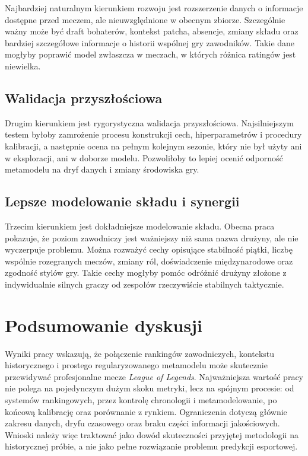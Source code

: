 Najbardziej naturalnym kierunkiem rozwoju jest rozszerzenie danych o informacje dostępne przed meczem, ale nieuwzględnione w obecnym zbiorze. Szczególnie ważny może być draft bohaterów, kontekst patcha, absencje, zmiany składu oraz bardziej szczegółowe informacje o historii wspólnej gry zawodników. Takie dane mogłyby poprawić model zwłaszcza w meczach, w których różnica ratingów jest niewielka.

\subsection{Walidacja przyszłościowa}

Drugim kierunkiem jest rygorystyczna walidacja przyszłościowa. Najsilniejszym testem byłoby zamrożenie procesu konstrukcji cech, hiperparametrów i procedury kalibracji, a następnie ocena na pełnym kolejnym sezonie, który nie był użyty ani w eksploracji, ani w doborze modelu. Pozwoliłoby to lepiej ocenić odporność metamodelu na dryf danych i zmiany środowiska gry.

\subsection{Lepsze modelowanie składu i synergii}

Trzecim kierunkiem jest dokładniejsze modelowanie składu. Obecna praca pokazuje, że poziom zawodniczy jest ważniejszy niż sama nazwa drużyny, ale nie wyczerpuje problemu. Można rozważyć cechy opisujące stabilność piątki, liczbę wspólnie rozegranych meczów, zmiany ról, doświadczenie międzynarodowe oraz zgodność stylów gry. Takie cechy mogłyby pomóc odróżnić drużyny złożone z indywidualnie silnych graczy od zespołów rzeczywiście stabilnych taktycznie.

\section{Podsumowanie dyskusji}

Wyniki pracy wskazują, że połączenie rankingów zawodniczych, kontekstu historycznego i prostego regularyzowanego metamodelu może skutecznie przewidywać profesjonalne mecze \textit{League of Legends}. Najważniejsza wartość pracy nie polega na pojedynczym dużym skoku metryki, lecz na spójnym procesie: od systemów rankingowych, przez kontrolę chronologii i metamodelowanie, po końcową kalibrację oraz porównanie z rynkiem. Ograniczenia dotyczą głównie zakresu danych, dryfu czasowego oraz braku części informacji jakościowych. Wnioski należy więc traktować jako dowód skuteczności przyjętej metodologii na historycznej próbie, a nie jako pełne rozwiązanie problemu predykcji esportowej.

